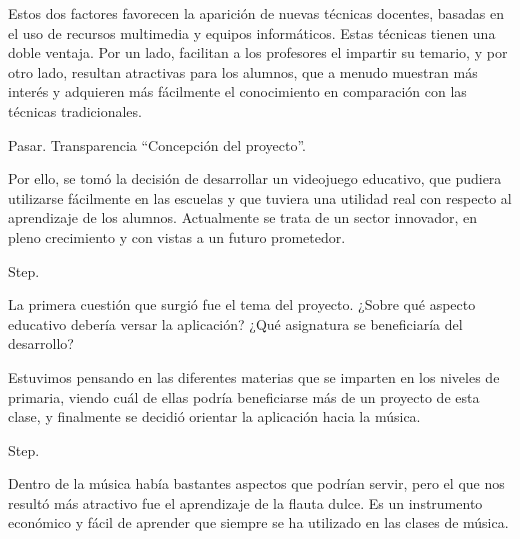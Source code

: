 \documentclass[landscape]{article}
\newenvironment{nota}
{%
\begin{framed} \noindent\itshape
}
{%
\end{framed}\vspace{-0.5cm} }
\begin{document}
\begin{multicols*}{2}
Estos dos factores favorecen la aparición de nuevas técnicas docentes, basadas
en el uso de recursos multimedia y equipos informáticos. Estas técnicas tienen
una doble ventaja. Por un lado, facilitan a los profesores el impartir su
temario, y por otro lado, resultan atractivas para los alumnos, que a menudo
muestran más interés y adquieren más fácilmente el conocimiento en comparación
con las técnicas tradicionales.

\begin{nota}
  Pasar. Transparencia ``Concepción del proyecto''.
\end{nota}

Por ello, se tomó la decisión de desarrollar un videojuego educativo, que
pudiera utilizarse fácilmente en las escuelas y que tuviera una utilidad real
con respecto al aprendizaje de los alumnos. Actualmente se trata de un sector
innovador, en pleno crecimiento y con vistas a un futuro prometedor.

\begin{nota}
  Step.
\end{nota}

La primera cuestión que surgió fue el tema del proyecto. ¿Sobre qué aspecto
educativo debería versar la aplicación? ¿Qué asignatura se beneficiaría del
desarrollo?

Estuvimos pensando en las diferentes materias que se imparten en los niveles de
primaria, viendo cuál de ellas podría beneficiarse más de un proyecto de esta
clase, y finalmente se decidió orientar la aplicación hacia la música.

\begin{nota}
  Step.
\end{nota}

Dentro de la música había bastantes aspectos que podrían servir, pero el que nos
resultó más atractivo fue el  aprendizaje de la flauta dulce. Es
un instrumento económico y fácil de aprender que siempre se ha utilizado en las
clases de música.

\vfill
\pagebreak


\end{multicols*}
\end{document}
